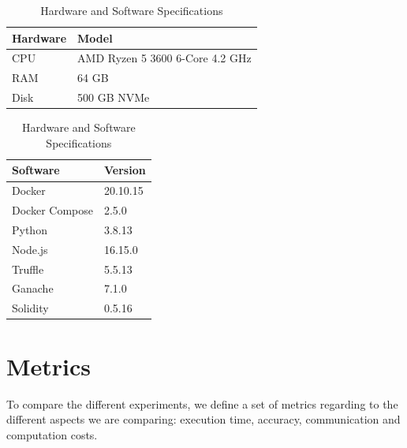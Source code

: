\begin{table}[!h]
    \begin{subtable}[h]{0.59\textwidth}
        \centering
        \begin{tabular}{l|l} \hline \hline
            Hardware & Model                                    \\ \hline \hline
            CPU      & AMD Ryzen 5 3600 6-Core 4.2 GHz          \\ \hline
            RAM      & 64 GB                                    \\ \hline
            Disk     & 500 GB NVMe                              \\ \hline
        \end{tabular}
        \caption{Hardware}
        \label{evaluation:hardware}
    \end{subtable}
    \hfill
    \begin{subtable}[h]{0.39\textwidth}
        \centering
        \begin{tabular}{l|l} \hline \hline
            Software            & Version               \\ \hline \hline
            Docker              & 20.10.15              \\ \hline
            Docker Compose      & 2.5.0                 \\ \hline
            Python              & 3.8.13               \\ \hline
            Node.js             & 16.15.0               \\ \hline
            Truffle             & 5.5.13               \\ \hline
            Ganache             & 7.1.0               \\ \hline
            Solidity            & 0.5.16               \\ \hline
        \end{tabular}
        \caption{Software}
        \label{evaluation:software}
     \end{subtable}
     \caption{Hardware and Software Specifications}
     \label{tab:temps}
\end{table}

\section{Metrics}\label{eval:metrics}

To compare the different experiments, we define a set of metrics regarding to the different aspects we are comparing: execution time, accuracy, communication and computation costs.

